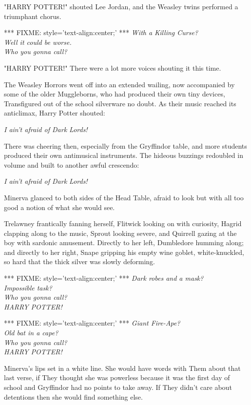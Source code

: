 "HARRY POTTER!" shouted Lee Jordan, and the Weasley twins performed a 
triumphant chorus.

*** FIXME: style='text-align:center;' ***
\emph{With a Killing Curse?\\
Well it could be worse.\\
Who you gonna call?}

"HARRY POTTER!" There were a lot more voices shouting it this time.

The Weasley Horrors went off into an extended wailing, now accompanied by some 
of the older Muggleborns, who had produced their own tiny devices, Transfigured 
out of the school silverware no doubt. As their music reached its anticlimax, 
Harry Potter shouted:

\emph{I ain't afraid of Dark Lords!}

There was cheering then, especially from the Gryffindor table, and more 
students produced their own antimusical instruments. The hideous buzzings 
redoubled in volume and built to another awful crescendo:

\emph{I ain't afraid of Dark Lords!}

Minerva glanced to both sides of the Head Table, afraid to look but with all 
too good a notion of what she would see.

Trelawney frantically fanning herself, Flitwick looking on with curiosity, 
Hagrid clapping along to the music, Sprout looking severe, and Quirrell gazing 
at the boy with sardonic amusement. Directly to her left, Dumbledore humming 
along; and directly to her right, Snape gripping his empty wine goblet, 
white-knuckled, so hard that the thick silver was slowly deforming.

*** FIXME: style='text-align:center;' ***
\emph{Dark robes and a mask?\\
Impossible task?\\
Who you gonna call?\\
HARRY POTTER!}

*** FIXME: style='text-align:center;' ***
\emph{Giant Fire-Ape?\\
Old bat in a cape?\\
Who you gonna call?\\
HARRY POTTER!}

Minerva's lips set in a white line. She would have words with Them about that 
last verse, if They thought she was powerless because it was the first day of 
school and Gryffindor had no points to take away. If They didn't care about 
detentions then she would find something else.

